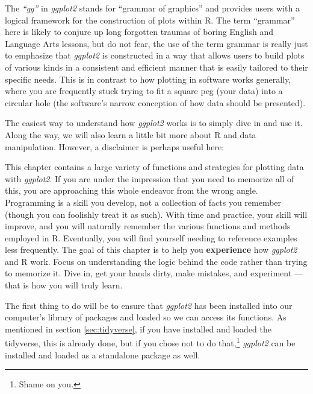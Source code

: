 The \textit{``gg''} in \textit{ggplot2} stands for ``grammar of graphics'' and provides users with a logical framework for the construction of plots within R.  The term ``grammar'' here is likely to conjure up long forgotten traumas of boring English and Language Arts lessons, but do not fear, the use of the term grammar is really just to emphasize that \textit{ggplot2} is constructed in a way that allows users to build plots of various kinds in a consistent and efficient manner that is easily tailored to their specific needs.  This is in contrast to how plotting in software works generally, where you are frequently stuck trying to fit a square peg (your data) into a circular hole (the software's narrow conception of how data should be presented).

The easiest way to understand how \textit{ggplot2} works is to simply dive in and use it. Along the way, we will also learn a little bit more about R and data manipulation. However, a disclaimer is perhaps useful here:

\begin{center}
    {\Huge\warning}
\end{center}

\begin{displayquote}
This chapter contains a large variety of functions and strategies for plotting data with \textit{ggplot2}. If you are under the impression that you need to memorize all of this, you are approaching this whole endeavor from the wrong angle. Programming is a skill you develop, not a collection of facts you remember (though you can foolishly treat it as such). With time and practice, your skill will improve, and you will naturally remember the various functions and methods employed in R. Eventually, you will find yourself needing to reference examples less frequently. The goal of this chapter is to help you \textbf{experience} how \textit{ggplot2} and R work. Focus on understanding the logic behind the code rather than trying to memorize it. Dive in, get your hands dirty, make mistakes, and experiment — that is how you will truly learn.
\end{displayquote}

The first thing to do will be to ensure that \textit{ggplot2} has been installed into our computer's library of packages and loaded so we can access its functions. As mentioned in section \ref{sec:tidyverse}, if you have installed and loaded the tidyverse, this is already done, but if you chose not to do that,\footnote{Shame on you.} \textit{ggplot2} can be installed and loaded as a standalone package as well.

